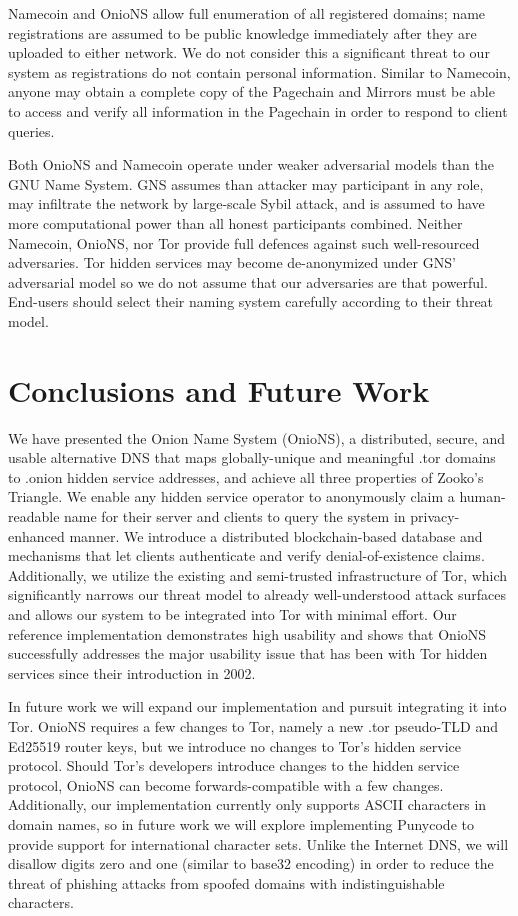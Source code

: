 \documentclass[USenglish,oneside,twocolumn]{article}
\begin{document}
Namecoin and OnioNS allow full enumeration of all registered domains; name registrations are assumed to be public knowledge immediately after they are uploaded to either network. We do not consider this a significant threat to our system as registrations do not contain personal information. Similar to Namecoin, anyone may obtain a complete copy of the Pagechain and Mirrors must be able to access and verify all information in the Pagechain in order to respond to client queries.

Both OnioNS and Namecoin operate under weaker adversarial models than the GNU Name System. GNS assumes than attacker may participant in any role, may infiltrate the network by large-scale Sybil attack, and is assumed to have more computational power than all honest participants combined. Neither Namecoin, OnioNS, nor Tor provide full defences against such well-resourced adversaries. Tor hidden services may become de-anonymized under GNS' adversarial model so we do not assume that our adversaries are that powerful. End-users should select their naming system carefully according to their threat model.

\section{Conclusions and Future Work}

We have presented the Onion Name System (OnioNS), a distributed, secure, and usable alternative DNS that maps globally-unique and meaningful .tor domains to .onion hidden service addresses, and achieve all three properties of Zooko's Triangle. We enable any hidden service operator to anonymously claim a human-readable name for their server and clients to query the system in privacy-enhanced manner. We introduce a distributed blockchain-based database and mechanisms that let clients authenticate and verify denial-of-existence claims. Additionally, we utilize the existing and semi-trusted infrastructure of Tor, which significantly narrows our threat model to already well-understood attack surfaces and allows our system to be integrated into Tor with minimal effort. Our reference implementation demonstrates high usability and shows that OnioNS successfully addresses the major usability issue that has been with Tor hidden services since their introduction in 2002.

In future work we will expand our implementation and pursuit integrating it into Tor. OnioNS requires a few changes to Tor, namely a new .tor pseudo-TLD and Ed25519 router keys, but we introduce no changes to Tor's hidden service protocol. Should Tor's developers introduce changes to the hidden service protocol, OnioNS can become forwards-compatible with a few changes. Additionally, our implementation currently only supports ASCII characters in domain names, so in future work we will explore implementing Punycode to provide support for international character sets. Unlike the Internet DNS, we will disallow digits zero and one (similar to base32 encoding) in order to reduce the threat of phishing attacks from spoofed domains with indistinguishable characters.
\end{document}
